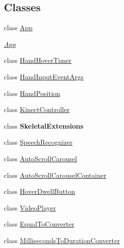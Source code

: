 \subsection*{Classes}
\begin{DoxyCompactItemize}
\item 
class \hyperlink{class_microsoft_1_1_samples_1_1_kinect_1_1_basic_interactions_1_1_app}{App}
\begin{DoxyCompactList}\small\item\em \hyperlink{class_microsoft_1_1_samples_1_1_kinect_1_1_basic_interactions_1_1_app}{App} \end{DoxyCompactList}\item 
class \hyperlink{class_microsoft_1_1_samples_1_1_kinect_1_1_basic_interactions_1_1_hand_hover_timer}{Hand\-Hover\-Timer}
\item 
class \hyperlink{class_microsoft_1_1_samples_1_1_kinect_1_1_basic_interactions_1_1_hand_input_event_args}{Hand\-Input\-Event\-Args}
\item 
class \hyperlink{class_microsoft_1_1_samples_1_1_kinect_1_1_basic_interactions_1_1_hand_position}{Hand\-Position}
\item 
class \hyperlink{class_microsoft_1_1_samples_1_1_kinect_1_1_basic_interactions_1_1_kinect_controller}{Kinect\-Controller}
\item 
class {\bfseries Skeletal\-Extensions}
\item 
class \hyperlink{class_microsoft_1_1_samples_1_1_kinect_1_1_basic_interactions_1_1_speech_recognizer}{Speech\-Recognizer}
\item 
class \hyperlink{class_microsoft_1_1_samples_1_1_kinect_1_1_basic_interactions_1_1_auto_scroll_carousel}{Auto\-Scroll\-Carousel}
\item 
class \hyperlink{class_microsoft_1_1_samples_1_1_kinect_1_1_basic_interactions_1_1_auto_scroll_carousel_container}{Auto\-Scroll\-Carousel\-Container}
\item 
class \hyperlink{class_microsoft_1_1_samples_1_1_kinect_1_1_basic_interactions_1_1_hover_dwell_button}{Hover\-Dwell\-Button}
\item 
class \hyperlink{class_microsoft_1_1_samples_1_1_kinect_1_1_basic_interactions_1_1_video_player}{Video\-Player}
\item 
class \hyperlink{class_microsoft_1_1_samples_1_1_kinect_1_1_basic_interactions_1_1_equal_to_converter}{Equal\-To\-Converter}
\item 
class \hyperlink{class_microsoft_1_1_samples_1_1_kinect_1_1_basic_interactions_1_1_milliseconds_to_duration_converter}{Milliseconds\-To\-Duration\-Converter}

\end{DoxyCompactItemize}
